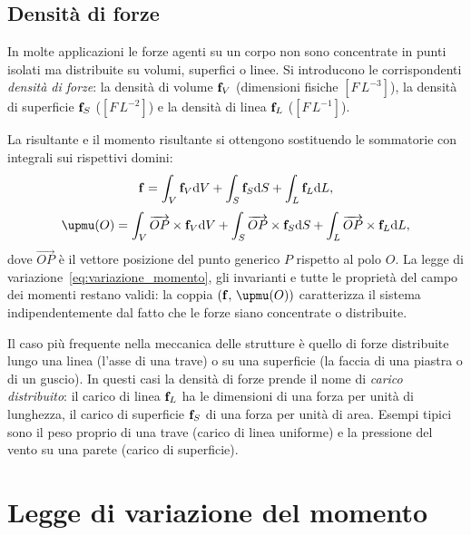 \subsection{Densità di forze}

In molte applicazioni le forze agenti su un corpo non sono
concentrate in punti isolati ma distribuite su volumi,
superfici o linee. Si introducono le corrispondenti
\textit{densità di forze}: la densità di volume $\mathbf{f}_V$
(dimensioni fisiche $[F\,L^{-3}]$), la densità di superficie
$\mathbf{f}_S$ ($[F\,L^{-2}]$) e la densità di linea $\mathbf{f}_L$
($[F\,L^{-1}]$).

La risultante e il momento risultante si ottengono
sostituendo le sommatorie con integrali sui rispettivi domini:
\begin{equation}\label{eq:risultante_distribuite}
	\mathbf{f} = \int_V \mathbf{f}_V \mathrm{d} V
	+ \int_S \mathbf{f}_S \mathrm{d} S
	+ \int_L \mathbf{f}_L \mathrm{d} L,
\end{equation}
\begin{equation}\label{eq:momento_distribuite}
	\bm{\upmu}(O) = \int_V \overrightarrow{OP}
	\times \fb_V \dd V
	+ \int_S \overrightarrow{OP}
	\times \fb_S \dd S
	+ \int_L \overrightarrow{OP}
	\times \fb_L \dd L,
\end{equation}
dove $\overrightarrow{OP}$ è il vettore posizione del punto
generico $P$ rispetto al polo $O$. La legge di
variazione~\eqref{eq:variazione_momento}, gli invarianti e
tutte le proprietà del campo dei momenti restano validi: la
coppia $(\fb,\,\bm{\upmu}(O))$ caratterizza il sistema
indipendentemente dal fatto che le forze siano concentrate o
distribuite.

\begin{oss}
	Il caso più frequente nella meccanica delle strutture è
	quello di forze distribuite lungo una linea (l'asse di una
	trave) o su una superficie (la faccia di una piastra o di
	un guscio). In questi casi la densità di forze prende il
	nome di \textit{carico distribuito}: il carico di linea
	$\mathbf{f}_L$ ha le dimensioni di una forza per unità di
	lunghezza, il carico di superficie $\mathbf{f}_S$ di una forza
	per unità di area. Esempi tipici sono il peso proprio di
	una trave (carico di linea uniforme) e la pressione del
	vento su una parete (carico di superficie).
\end{oss}

\section{Legge di variazione del momento}

